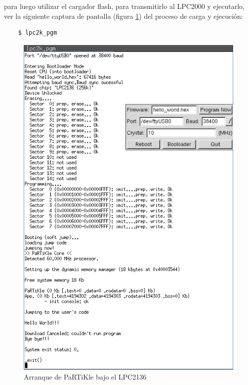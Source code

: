 \documentclass[10pt,a4paper]{article}
\begin{document}
	para luego utilizar el cargador flash, para transmitirlo al LPC2000 y ejecutarlo,
	ver la siguiente captura de pantalla (figura \ref{fig:lpc-bootscr}) del proceso de carga y ejecución:

	\begin{verbatim}
	$ lpc2k_pgm
	\end{verbatim}
	
	\begin{figure}[htbp]
	\begin{center}
	\includegraphics[width = 1.0\columnwidth]{img/lpc-bootscr}
	\end{center}
	
	\caption{Arranque de PaRTiKle bajo el LPC2136}
	\label{fig:lpc-bootscr}
	\end{figure}

\newpage


\end{document}
